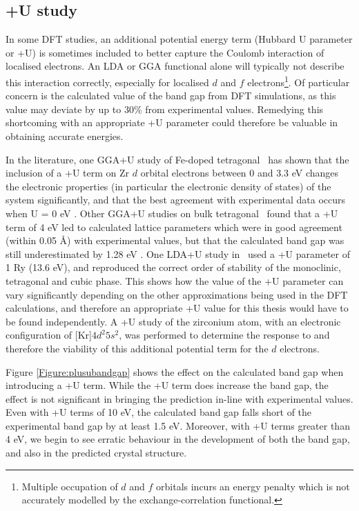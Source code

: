 \subsection{+U study}
\label{subsection:plus_U}

In some DFT studies, an additional potential energy term (Hubbard U parameter or +U) is sometimes included to better capture the Coulomb interaction of localised electrons. An LDA or GGA functional alone will typically not describe this interaction correctly, especially for localised $d$ and $f$ electrons\footnote{Multiple occupation of $d$ and $f$ orbitals incurs an energy penalty which is not accurately modelled by the exchange-correlation functional.}. Of particular concern is the calculated value of the band gap from DFT simulations, as this value may deviate by up to 30\% from experimental values. Remedying this shortcoming with an appropriate +U parameter could therefore be valuable in obtaining accurate energies. 

In the literature, one GGA+U study of Fe-doped tetragonal \zirconia\ has shown that the inclusion of a +U term on Zr $d$ orbital electrons between 0 and 3.3 eV changes the electronic properties (in particular the electronic density of states) of the system significantly, and that the best agreement with experimental data occurs when U = 0 eV \cite{Sangalli2013}. Other GGA+U studies on bulk tetragonal \zirconia\ found that a +U term of 4 eV led to calculated lattice parameters which were in good agreement (within 0.05 \r{A}) with experimental values, but that the calculated band gap was still underestimated by 1.28 eV \cite{RuizPuigdollers2016, Chen2015, Puigdollers2015}. One LDA+U study in \zirconia\ used a +U parameter of 1 Ry (13.6 eV), and reproduced the correct order of stability of the monoclinic, tetragonal and cubic phase. This shows how the value of the +U parameter can vary significantly depending on the other approximations being used in the DFT calculations, and therefore an appropriate +U value for this thesis would have to be found independently. A +U study of the zirconium atom, with an electronic configuration of [Kr]$4d^{2}5s^{2}$, was performed to determine the response to and therefore the viability of this additional potential term for the $d$ electrons.

Figure \ref{Figure:plusubandgap} shows the effect on the calculated band gap when introducing a +U term. While the +U term does increase the band gap, the effect is not significant in bringing the prediction in-line with experimental values. Even with +U terms of 10 eV, the calculated band gap falls short of the experimental band gap by at least 1.5 eV. Moreover, with +U terms greater than 4 eV, we begin to see erratic behaviour in the development of both the band gap, and also in the predicted crystal structure. 

